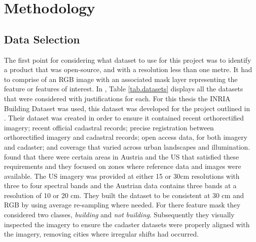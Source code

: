 \chapter{Methodology}

\section{Data Selection}
The first point for considering what dataset to use for this project was to identify a product that was open-source, and with a resolution less than one metre. It had to comprise of an RGB image with an associated mask layer representing the feature or features of interest. In \cite{Richmond19b}, Table \ref{tab.datasets} displays all the datasets that were considered with justifications for each. For this thesis the INRIA Building Dataset was used, this dataset was developed for the project outlined in \cite{maggiori17a}. Their dataset was created in order to ensure it contained recent orthorectified imagery; recent official cadastral records; precise registration between orthorectified imagery and cadastral records; open access data, for both imagery and cadaster; and coverage that varied across urban landscapes and illumination. \cite{maggiori17a} found that there were certain areas in Austria and the US that satisfied these requirements and they focused on zones where reference data and images were available. The US imagery was provided at either 15 or 30cm resolutions with three to four spectral bands and the Austrian data contains three bands at a resolution of 10 or 20 cm. They built the dataset to be consistent at 30 cm and RGB by using average re-sampling where needed. For there feature mask they considered two classes, \textit{building} and \textit{not building}. Subsequently they visually inspected the imagery to ensure the cadaster datasets were properly aligned with the imagery, removing cities where irregular shifts had occurred. 

